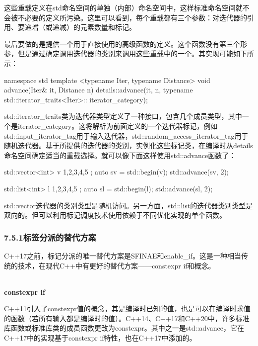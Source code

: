 这些重载定义在std命名空间的单独（内部）命名空间中，这样标准命名空间就不会被不必要的定义所污染。这里可以看到，每个重载都有三个参数：对迭代器的引用、要递增（或递减）的元素数量和标记。

最后要做的是提供一个用于直接使用的高级函数的定义。这个函数没有第三个形参，但是通过确定调用迭代器的类别来调用这些重载中的一个。其实现可能如下所示：

\begin{cpp}
namespace std
{
	template <typename Iter, typename Distance>
	void advance(Iter& it, Distance n)
	{
		details::advance(it, n,
			typename std::iterator_traits<Iter>::
								iterator_category{});
	}
}
\end{cpp}

std::iterator\_traits类为迭代器类型定义了一种接口，包含几个成员类型，其中一个是iterator\_category。这将解析为前面定义的一个迭代器标记，例如std::input\_iterator\_tag用于输入迭代器，std::random\_access\_iterator\_tag用于随机迭代器。基于所提供的迭代器的类别，实例化这些标记类，在编译时从details命名空间确定适当的重载选择。就可以像下面这样使用std::advance函数了：

\begin{cpp}
std::vector<int> v{ 1,2,3,4,5 };
auto sv = std::begin(v);
std::advance(sv, 2);

std::list<int> l{ 1,2,3,4,5 };
auto sl = std::begin(l);
std::advance(sl, 2);
\end{cpp}

std::vector迭代器的类别类型是随机访问。另一方面，std::list的迭代器类别类型是双向的。但可以利用标记调度技术使用依赖于不同优化实现的单个函数。

\subsubsection{7.5.1\hspace{0.2cm}标签分派的替代方案}

C++17之前，标记分派的唯一替代方案是SFINAE和enable\_if。这是一种相当传统的技术，在现代C++中有更好的替代方案——constexpr if和概念。

\noindent
\hspace*{\fill} \\ %
\textbf{constexpr if}

C++11引入了constexpr值的概念，其是编译时已知的值，也是可以在编译时求值的函数（若所有输入都是编译时的值）。C++14、C++17和C++20中，许多标准库函数或标准库类的成员函数更改为constexpr。其中之一是std::advance，它在C++17中的实现基于constexpr if特性，也在C++17中添加的。

